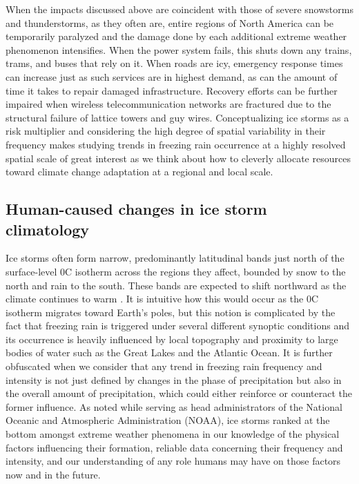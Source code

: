 \documentclass[twocol]{ametsoc}
\begin{document}
When the impacts discussed above are coincident with those of severe snowstorms and thunderstorms, as they often are, entire regions of North America can be temporarily paralyzed and the damage done by each additional extreme weather phenomenon intensifies. When the power system fails, this shuts down any trains, trams, and buses that rely on it. When roads are icy, emergency response times can increase just as such services are in highest demand, as can the amount of time it takes to repair damaged infrastructure. Recovery efforts can be further impaired when wireless telecommunication networks are fractured due to the structural failure of lattice towers and guy wires. Conceptualizing ice storms as a risk multiplier and considering the high degree of spatial variability in their frequency makes studying trends in freezing rain occurrence at a highly resolved spatial scale of great interest as we think about how to cleverly allocate resources toward climate change adaptation at a regional and local scale.

\subsection{Human-caused changes in ice storm climatology}
Ice storms often form narrow, predominantly latitudinal bands just north of the surface-level 0\degree C isotherm across the regions they affect, bounded by snow to the north and rain to the south. These bands are expected to shift northward as the climate continues to warm \citep{cheng2011possible,lambert2011simulated}. It is intuitive how this would occur as the 0\degree C isotherm migrates toward Earth's poles, but this notion is complicated by the fact that freezing rain is triggered under several different synoptic conditions and its occurrence is heavily influenced by local topography and proximity to large bodies of water such as the Great Lakes and the Atlantic Ocean. It is further obfuscated when we consider that any trend in freezing rain frequency and intensity is not just defined by changes in the phase of precipitation but also in the overall amount of precipitation, which could either reinforce or counteract the former influence. As \citet{lubchenco2012extreme} noted while serving as head administrators of the National Oceanic and Atmospheric Administration (NOAA), ice storms ranked at the bottom amongst extreme weather phenomena in our knowledge of the physical factors influencing their formation, reliable data concerning their frequency and intensity, and our understanding of any role humans may have on those factors now and in the future.
\end{document}
